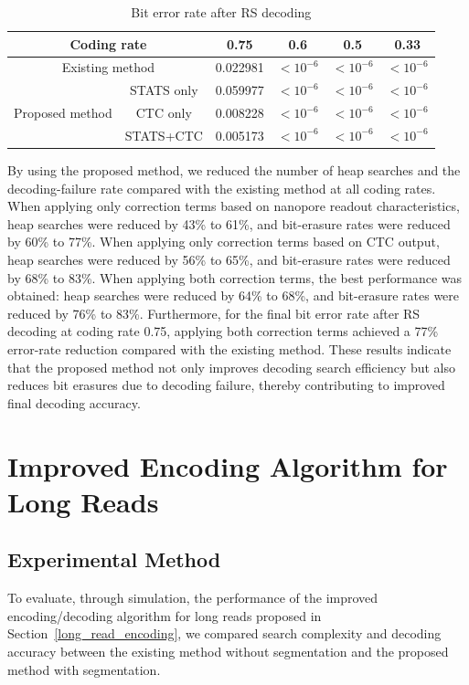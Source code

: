 \documentclass[sotsuron]{kuee}
\begin{document}
\begin{table}
  \centering
  \caption{Bit error rate after RS decoding}
  \label{tab:results_final_ber}
  \begin{tabular}{c|c|cccc}
    \hline
    \multicolumn{2}{c|}{Coding rate} & 0.75 & 0.6 & 0.5 & 0.33 \\
    \hline
    \multicolumn{2}{c|}{Existing method} & 0.022981 & $<10^{-6}$ & $<10^{-6}$ & $<10^{-6}$ \\
    \hline
    \multirow{3}{*}{Proposed method} & STATS only & 0.059977 & $<10^{-6}$ & $<10^{-6}$ & $<10^{-6}$ \\
    \cline{2-6}
     & CTC only & 0.008228 & $<10^{-6}$ & $<10^{-6}$ & $<10^{-6}$ \\
    \cline{2-6}
     & STATS+CTC & 0.005173 & $<10^{-6}$ & $<10^{-6}$ & $<10^{-6}$ \\
    \hline
  \end{tabular}
\end{table}
By using the proposed method, we reduced the number of heap searches and the
decoding-failure rate compared with the existing method at all coding rates.
When applying only correction terms based on nanopore readout
characteristics, heap searches were reduced by 43\% to 61\%, and bit-erasure
rates were reduced by 60\% to 77\%.
When applying only correction terms based on CTC output, heap searches were
reduced by 56\% to 65\%, and bit-erasure rates were reduced by 68\% to 83\%.
When applying both correction terms, the best performance was obtained:
heap searches were reduced by 64\% to 68\%, and bit-erasure rates were reduced
by 76\% to 83\%.
Furthermore, for the final bit error rate after RS decoding at coding rate
0.75, applying both correction terms achieved a 77\% error-rate reduction
compared with the existing method.
These results indicate that the proposed method not only improves decoding
search efficiency but also reduces bit erasures due to decoding failure,
thereby contributing to improved final decoding accuracy.

\section{Improved Encoding Algorithm for Long Reads} \label{sim2}
\subsection{Experimental Method}
To evaluate, through simulation, the performance of the improved
encoding/decoding algorithm for long reads proposed in
Section~\ref{long_read_encoding}, we compared search complexity and decoding
accuracy between the existing method without segmentation and the proposed
method with segmentation.
\end{document}
